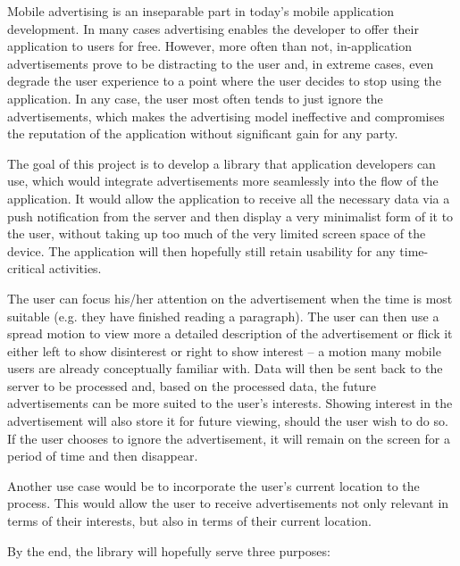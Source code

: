 

\begin{abstracts}        %

Mobile advertising is an inseparable part in today's mobile application development. In many cases advertising enables the developer to offer their application to users for free. However, more often than not, in-application advertisements prove to be distracting to the user and, in extreme cases, even degrade the user experience to a point where the user decides to stop using the application. In any case, the user most often tends to just ignore the advertisements, which makes the advertising model ineffective and compromises the reputation of the application without significant gain for any party.

The goal of this project is to develop a library that application developers can use, which would integrate advertisements more seamlessly into the flow of the application. It would allow the application to receive all the necessary data via a push notification from the server and then display a very minimalist form of it to the user, without taking up too much of the very limited screen space of the device. The application will then hopefully still retain usability for any time-critical activities.

The user can focus his/her attention on the advertisement when the time is most suitable (e.g. they have finished reading a paragraph). The user can then use a spread motion to view more a detailed description of the advertisement or flick it either left to show disinterest or right to show interest – a motion many mobile users are already conceptually familiar with. Data will then be sent back to the server to be processed and, based on the processed data, the future advertisements can be more suited to the user's interests. Showing interest in the advertisement will also store it for future viewing, should the user wish to do so. If the user chooses to ignore the advertisement, it will remain on the screen for a period of time and then disappear.

Another use case would be to incorporate the user's current location to the process. This would allow the user to receive advertisements not only relevant in terms of their interests, but also in terms of their current location.

By the end, the library will hopefully serve three purposes:


\end{abstracts}
